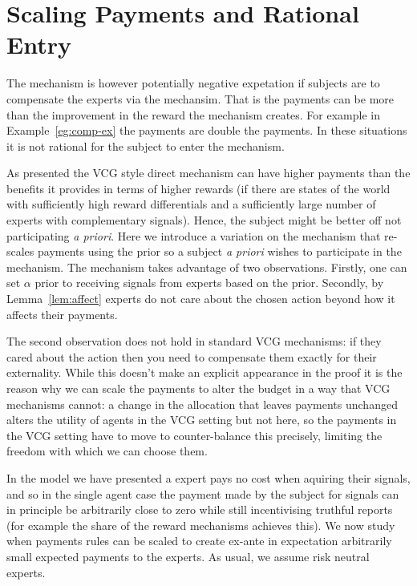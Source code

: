 \section{Scaling Payments and Rational Entry}


The mechanism is however potentially negative expetation if subjects are to compensate the experts via the mechansim.  That is the payments can be more than the improvement in the reward the mechanism creates. For example in Example~\ref{eg:comp-ex} the payments are double the payments. In these situations it is not rational for the subject to enter the mechanism.


As presented the VCG style direct mechanism can have higher payments than the benefits it provides in terms of higher rewards (if there are states of the world with sufficiently high reward differentials and a sufficiently large number of experts with complementary signals). Hence, the subject might be better off not participating \emph{a priori}. Here we introduce a variation on the mechanism that re-scales payments using the prior so a subject \emph{a priori} wishes to participate in the mechanism. The mechanism takes advantage of two observations. Firstly, one can set $\alpha$ prior to receiving signals from experts based on the prior. Secondly, by Lemma~\ref{lem:affect} experts do not care about the chosen action beyond how it affects their payments. 

The second observation does not hold in standard VCG mechanisms: if they cared about the action then you need to compensate them exactly for their externality. While this doesn't make an explicit appearance in the proof it is the reason why we can scale the payments to alter the budget in a way that VCG mechanisms cannot: a change in the allocation that leaves payments unchanged alters the utility of agents in the VCG setting but not here, so the payments in the VCG setting have to move to counter-balance this precisely, limiting the freedom with which we can choose them.


In the model we have presented a expert pays no cost when aquiring their signals, and so in the single agent case the payment made by the subject for signals can in principle be arbitrarily close to zero while still incentivising truthful reports (for example the share of the reward mechanisms achieves this). We now study when payments rules can be scaled to create ex-ante in expectation arbitrarily small expected payments to the experts. As usual, we assume risk neutral experts. 



